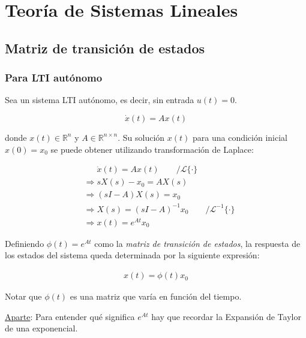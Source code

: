 \chapter{Teoría de Sistemas Lineales}

\section{Matriz de transición de estados}
\subsection{Para LTI autónomo}
Sea un sistema LTI autónomo, es decir, sin entrada $u(t) = 0$.

\begin{equation}
    \dot{x}(t) = {A} {x}(t)
\end{equation}

\noindent donde $x(t) \in \mathbb{R}^n$ y $A \in \mathbb{R}^{n \times n}$. Su solución ${x}(t)$ para una condición inicial $x(0) = x_0$ se puede obtener utilizando transformación de Laplace:

\begin{subequations}
\begin{align}
    &\phantom{\Longrightarrow} {\dot{x}}(t) = {A} {x}(t) \qquad /\mathcal{L}\{\cdot\}\\
    &\Longrightarrow s {X}(s)- {x_0} =  {A} {X}(s)\\
    &\Longrightarrow (s {I}- {A}) {X}(s) = {x_0}\\
    &\Longrightarrow  {X}(s) = (s {I}- {A})^{-1} {x_0} \qquad /\mathcal{L}^{-1}\{\cdot\}\\
    &\Longrightarrow  {x}(t) = e^{ {A}t} {x_0}
\end{align}
\end{subequations}

Definiendo $ {\phi}(t) = e^{ {A}t}$ como la \emph{matriz de transición de estados}, la respuesta de los estados del sistema queda determinada por la siguiente expresión:

\begin{align}
    {x}(t) = {\phi}(t){x_0}
\end{align}

Notar que $ {\phi}(t)$ es una matriz que varía en función del tiempo.

\noindent \underline{Aparte}: Para entender qué significa $e^{ {A}t}$ hay que recordar la Expansión de Taylor de una exponencial.\\

